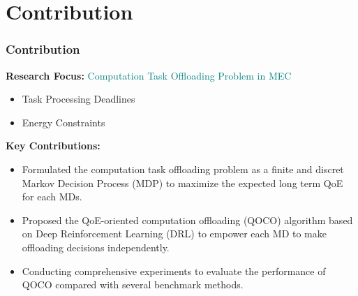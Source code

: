 \section{Contribution}


\begin{frame}
	\frametitle{Contribution}
	
	\textbf{Research Focus:} 
	\textcolor{teal}{Computation Task Offloading Problem in MEC}
	
		\begin{itemize}
		
		\item Task Processing Deadlines
		
		\item Energy Constraints
		
		
	\end{itemize}
	

	
	\vspace{2mm}
	
	\textbf{Key Contributions:}
	
	\begin{itemize}
		
		\item Formulated the computation task offloading problem as a finite and discret Markov Decision Process (MDP) to maximize the expected long term QoE for each MDs.
		
		\item Proposed the QoE-oriented computation offloading (QOCO) algorithm based on Deep Reinforcement Learning (DRL) to empower each MD to make offloading decisions independently.
		
		\item Conducting comprehensive experiments to evaluate the performance of QOCO compared with several benchmark methods.
		
	\end{itemize}
	
\end{frame}
